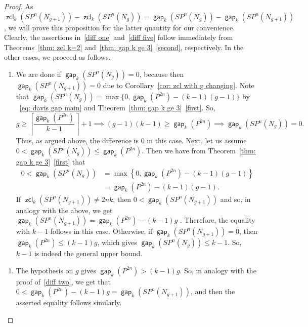 \documentclass[amscd,amssymb,verbatim,10pt]{amsart}
\numberwithin{equation}{section}
\theoremstyle{plain}
\theoremstyle{definition}
\DeclareMathOperator{\zcl}{{\mathsf{zcl}}}
\DeclareMathOperator{\gap}{{\mathsf{gap}}}
\begin{document}
\begin{proof}
As $\zcl_k(SP^n(N_{g+1}))-\zcl_k(SP^n(N_g))=\gap_k(SP^n(N_g))-\gap_k(SP^n(N_{g+1}))$, we will prove this proposition for the latter quantity for our convenience. Clearly, the assertions in~\eqref{diff one} and~\eqref{diff five} follow immediately from Theorems~\ref{thm: zcl k=2} and~\ref{thm: gap k ge 3}~\eqref{second}, respectively. In the other cases, we proceed as follows.

\begin{enumerate}[(2)]
    \item We are done if $\gap_k(SP^n(N_{g}))=0$, because then $\gap_k(SP^n(N_{g+1}))=0$ due to Corollary~\ref{cor: zcl with g changing}. Note that $\gap_k(SP^n(N_g))=\max\{0,\gap_k(P^{2n})-(k-1)(g-1)\}$ by ~\eqref{eq: davis gap main} and Theorem~\ref{thm: gap k ge 3}~\eqref{first}. So,
    \[
    g\ge\left\lceil\frac{\gap_k(P^{2n})}{k-1}\right\rceil+1\implies (g-1)(k-1)\ge\gap_k(P^{2n})\implies \gap_k(SP^n(N_g))=0.
    \]
Thus, as argued above, the difference is $0$ in this case. Next, let us assume $0<\gap_k(SP^n(N_{g}))\le\gap_k(P^{2n})$. Then we have from Theorem~\ref{thm: gap k ge 3}~\eqref{first} that
\begin{align*}
    0<\gap_k(SP^n(N_g))&=\max\left\{0,\gap_k(P^{2n})-(k-1)(g-1) \right\}
    \\
    & =\gap_k(P^{2n})-(k-1)(g-1).
\end{align*}
If $\zcl_k(SP^n(N_{g+1}))\ne 2nk$, then $0<\gap_k(SP^n(N_{g+1}))$ and so, in analogy with the above, we get $\gap_k(SP^n(N_{g+1}))=\gap_k(P^{2n})-(k-1)g$ . Therefore, the equality with $k-1$ follows in this case. Otherwise, if $\gap_k(SP^n(N_{g+1}))=0$, then $\gap_k(P^{2n})\le(k-1)g$, which gives $\gap_k(SP^n(N_g))\le k-1$. So, $k-1$ is indeed the general upper bound. 
\end{enumerate}

\begin{enumerate}[(3)]
\item The hypothesis on $g$ gives $\gap_k(P^{2n})>(k-1)g$. So, in analogy with the proof of~\eqref{diff two}, we get that $0<\gap_k(P^{2n})-(k-1)g=\gap_k(SP^n(N_{g+1}))$, and then the asserted equality follows similarly.
\end{enumerate}


\end{proof}
\end{document}
